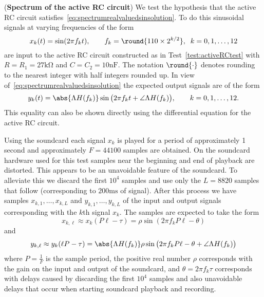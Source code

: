 \begin{test}\label{test:activeRCspectrumtest}
(\textbf{Spectrum of the active RC circuit})
We test the hypothesis that the active RC circuit satisfies~\eqref{eq:spectrumrealvaluedsinsolution}.  To do this sinusoidal signals at varying frequencies of the form
\[
x_k(t) = \sin( 2 \pi f_k t ), \qquad f_k = \round{110 \times 2^{k/2}}, \;\; k = 0,1,\dots,12
\]
are input to the active RC circuit constructed as in Test~\ref{test:activeRCtest} with $R = R_1 = 27\si{\kilo\ohm}$ and $C=C_2=10\si{\nano\farad}$.  The notation $\round{\cdot}$ denotes rounding to the nearest integer with half integers rounded up.  In view of~\eqref{eq:spectrumrealvaluedsinsolution} the expected output signals are of the form
\[
y_k(t) =  \abs{\Lambda H(f_k)}\sin\big( 2 \pi f_k  t + \angle \Lambda H(f_k)\big), \qquad k = 0,1,\dots,12.
\]
This equality can also be shown directly using the differential equation for the active RC circuit. 

Using the soundcard each signal $x_k$ is played for a period of approximately 1 second and approximately $F = 44100$ samples are obtained. On the soundcard hardware used for this test samples near the beginning and end of playback are distorted.  This appears to be an unavoidable feature of the soundcard.  To alleviate this we discard the first $10^4$ samples and use only the $L=8820$ samples that follow (corresponding to $200\si{\milli\second}$ of signal).  After this process we have samples $x_{k,1},\dots,x_{k,L}$ and $y_{k,1},\dots,y_{k,L}$ of the input and output signals corresponding with the $k$th signal $x_k$.  The samples are expected to take the form
\[
x_{k,\ell} \approx x_k(P \ell - \tau) = \rho \sin( 2 \pi f_k P \ell - \theta) 
\]
and
\[
y_{k,\ell} \approx y_k(\ell P - \tau) =  \abs{\Lambda H(f_k)} \rho \sin\big( 2 \pi f_k P\ell - \theta  + \angle \Lambda H(f_k) \big)
\]
where $P = \frac{1}{F}$  is the sample period, the positive real number $\rho$ corresponds with the gain on the input and output of the soundcard, and $\theta = 2\pi f_k \tau$ corresponds with delays caused by discarding the first $10^4$ samples and also unavoidable delays that occur when starting soundcard playback and recording.


\end{test}
